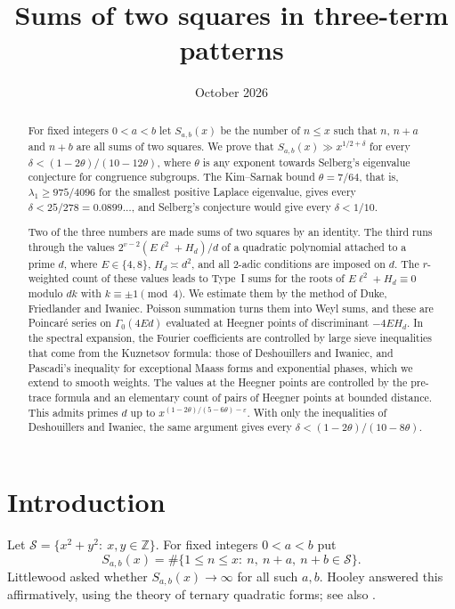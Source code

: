 \documentclass[11pt]{amsart}
\title{Sums of two squares in three-term patterns}
\date{October 2026}
\theoremstyle{remark}
\theoremstyle{definition}
\numberwithin{equation}{section}
\newcommand{\Sc}{\mathcal{S}}
\newcommand{\Z}{\mathbb{Z}}
\newcommand{\eps}{\varepsilon}
\begin{document}
\begin{abstract}
For fixed integers $0<a<b$ let $S_{a,b}(x)$ be the number of $n\le x$ such that $n$, $n+a$ and $n+b$ are all sums of two squares. We prove that $S_{a,b}(x)\gg x^{1/2+\delta}$ for every $\delta<(1-2\theta)/(10-12\theta)$, where $\theta$ is any exponent towards Selberg's eigenvalue conjecture for congruence subgroups. The Kim--Sarnak bound $\theta=7/64$, that is, $\lambda_1\ge975/4096$ for the smallest positive Laplace eigenvalue, gives every $\delta<25/278=0.0899\ldots$, and Selberg's conjecture would give every $\delta<1/10$.

Two of the three numbers are made sums of two squares by an identity. The third runs through the values $2^{v-2}(E\ell^2+H_d)/d$ of a quadratic polynomial attached to a prime $d$, where $E\in\{4,8\}$, $H_d\asymp d^2$, and all $2$-adic conditions are imposed on $d$. The $r$-weighted count of these values leads to Type~I sums for the roots of $E\ell^2+H_d\equiv0$ modulo $dk$ with $k\equiv\pm1\pmod 4$. We estimate them by the method of Duke, Friedlander and Iwaniec. Poisson summation turns them into Weyl sums, and these are Poincar\'e series on $\Gamma_0(4Ed)$ evaluated at Heegner points of discriminant $-4EH_d$. In the spectral expansion, the Fourier coefficients are controlled by large sieve inequalities that come from the Kuznetsov formula: those of Deshouillers and Iwaniec, and Pascadi's inequality for exceptional Maass forms and exponential phases, which we extend to smooth weights. The values at the Heegner points are controlled by the pre-trace formula and an elementary count of pairs of Heegner points at bounded distance. This admits primes $d$ up to $x^{(1-2\theta)/(5-6\theta)-\eps}$. With only the inequalities of Deshouillers and Iwaniec, the same argument gives every $\delta<(1-2\theta)/(10-8\theta)$.
\end{abstract}

\maketitle

\section{Introduction}

Let $\Sc=\{x^2+y^2:\ x,y\in\Z\}$. For fixed integers $0<a<b$ put
\[
S_{a,b}(x)=\#\{1\le n\le x:\ n,\ n+a,\ n+b\in\Sc\}.
\]
Littlewood asked whether $S_{a,b}(x)\to\infty$ for all such $a,b$. Hooley \cite{Ho73} answered this affirmatively, using the theory of ternary quadratic forms; see also \cite[\S2.1]{FKR}.
\end{document}
